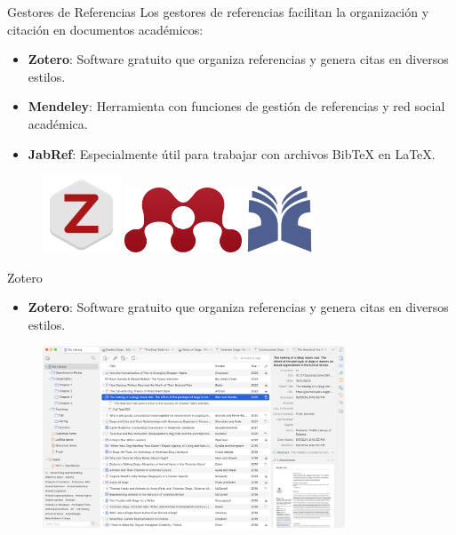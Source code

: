 \documentclass[
11pt, %
]{beamer}
\begin{document}
\begin{frame}{Gestores de Referencias}
	Los gestores de referencias facilitan la organización y citación en documentos académicos:
	\begin{itemize}
		\item \textbf{Zotero}: Software gratuito que organiza referencias y genera citas en diversos estilos.
		\item \textbf{Mendeley}: Herramienta con funciones de gestión de referencias y red social académica.
		\item \textbf{JabRef}: Especialmente útil para trabajar con archivos BibTeX en LaTeX.
	\end{itemize}
	\begin{figure}[h!]
		\centering
		\includegraphics[width=2.3cm]{logo zotero.png}
		\hspace{0.5cm} %
		\includegraphics[width=3.5cm]{logo mendeley.png}
		\hspace{0.5cm} %
		\includegraphics[width=2cm]{logo jabref.png}
	\end{figure}
\end{frame}

\begin{frame}{Zotero}
	\begin{itemize}
		\item \textbf{Zotero}: Software gratuito que organiza referencias y genera citas en diversos estilos.
	\end{itemize}
	\begin{figure}[h!]
		\centering
		\includegraphics[width=9cm]{zotero.png}
	\end{figure}
\end{frame}
\end{document}

